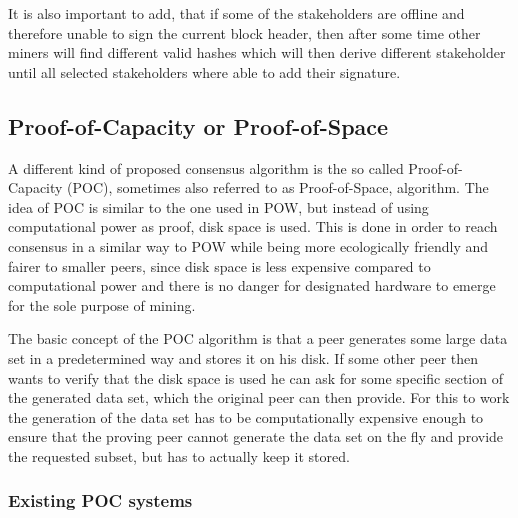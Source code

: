 It is also important to add, that if some of the stakeholders are offline and therefore unable to sign the current block header, then after some time other miners will find different valid hashes
which will then derive different stakeholder until all selected stakeholders where able to add their signature.\cite{url:poa}

\subsection{Proof-of-Capacity or Proof-of-Space}

\label{proof-of-space}

A different kind of proposed consensus algorithm is the so called Proof-of-Capacity (POC), sometimes also referred to as Proof-of-Space, algorithm. The idea of POC is similar to the one used in POW,
but instead of using computational power as proof, disk space is used. This is done in order to reach consensus in a similar way to POW while being more ecologically friendly and fairer to smaller
peers, since disk space is less expensive compared to computational power and there is no danger for designated hardware to emerge for the sole purpose of mining.\par The basic concept of the POC
algorithm is that a peer generates some large data set in a predetermined way and stores it on his disk. If some other peer then wants to verify that the disk space is used he can ask for some
specific section of the generated data set, which the original peer can then provide. For this to work the generation of the data set has to be computationally expensive enough to ensure that the
proving peer cannot generate the data set on the fly and provide the requested subset, but has to actually keep it stored.\cite{url:poc}

\subsubsection{Existing POC systems}

